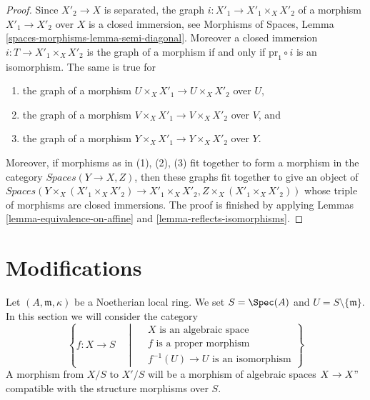 \begin{proof}
Since $X'_2 \to X$ is separated, the graph $i : X'_1 \to X'_1 \times_X X'_2$
of a morphism $X'_1 \to X'_2$ over $X$ is a closed immersion, see
Morphisms of Spaces, Lemma \ref{spaces-morphisms-lemma-semi-diagonal}.
Moreover a closed immersion $i : T \to X'_1 \times_X X'_2$ is the graph of a
morphism if and only if $\text{pr}_1 \circ i$ is an isomorphism.
The same is true for
\begin{enumerate}
\item the graph of a morphism $U \times_X X'_1 \to U \times_X X'_2$ over $U$,
\item the graph of a morphism $V \times_X X'_1 \to V \times_X X'_2$ over $V$,
and
\item the graph of a morphism $Y \times_X X'_1 \to Y \times_X X'_2$ over $Y$.
\end{enumerate}
Moreover, if morphisms as in (1), (2), (3) fit together to form a
morphism in the category $\textit{Spaces}(Y \to X, Z)$, then these
graphs fit together to give an object of
$\textit{Spaces}(Y \times_X (X'_1 \times_X X'_2) \to X'_1 \times_X X'_2,
Z \times_X (X'_1 \times_X X'_2))$
whose triple of morphisms are closed immersions. The proof is finished
by applying Lemmas \ref{lemma-equivalence-on-affine} and
\ref{lemma-reflects-isomorphisms}.
\end{proof}






\section{Modifications}
\label{section-modifications}

\noindent
Let $(A, \mathfrak m, \kappa)$ be a Noetherian local ring. We set
$S = \Spec(A)$ and $U = S \setminus \{\mathfrak m\}$. In this section
we will consider the category
\begin{equation}
\label{equation-modification}
\left\{
f : X \longrightarrow S
\quad \middle | \quad
\begin{matrix}
X\text{ is an algebraic space}\\
f\text{ is a proper morphism}\\
f^{-1}(U) \to U\text{ is an isomorphism}
\end{matrix}
\right\}
\end{equation}
A morphism from $X/S$ to $X'/S$ will be a morphism of algebraic spaces
$X \to X"$ compatible with the structure morphisms over $S$.

